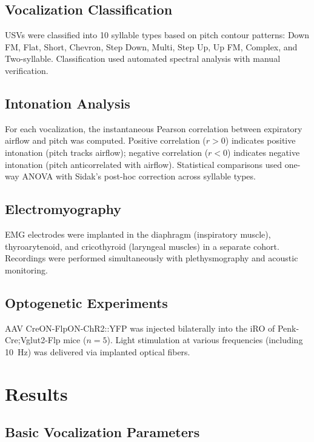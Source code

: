 \documentclass[11pt]{article}
\begin{document}
\subsection{Vocalization Classification}

USVs were classified into 10 syllable types based on pitch contour patterns: Down FM, Flat, Short, Chevron, Step Down, Multi, Step Up, Up FM, Complex, and Two-syllable. Classification used automated spectral analysis with manual verification.

\subsection{Intonation Analysis}

For each vocalization, the instantaneous Pearson correlation between expiratory airflow and pitch was computed. Positive correlation ($r > 0$) indicates positive intonation (pitch tracks airflow); negative correlation ($r < 0$) indicates negative intonation (pitch anticorrelated with airflow). Statistical comparisons used one-way ANOVA with Sidak's post-hoc correction across syllable types.

\subsection{Electromyography}

EMG electrodes were implanted in the diaphragm (inspiratory muscle), thyroarytenoid, and cricothyroid (laryngeal muscles) in a separate cohort. Recordings were performed simultaneously with plethysmography and acoustic monitoring.

\subsection{Optogenetic Experiments}

AAV CreON-FlpON-ChR2::YFP was injected bilaterally into the iRO of Penk-Cre;Vglut2-Flp mice ($n = 5$). Light stimulation at various frequencies (including 10~Hz) was delivered via implanted optical fibers.

\section{Results}

\subsection{Basic Vocalization Parameters}
\end{document}
